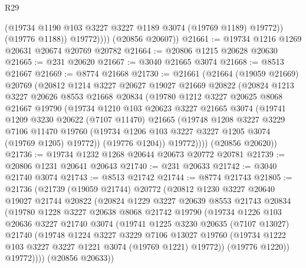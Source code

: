 \begin{lexlean}{R29}
\begin{coremodule}
                  (@19734 @1190 @103 @3227 @3227 @1189 @3074 (@19769 @1189) @19772))
                (@19776 @1188))
              @19772))))
      (@20856 @20607))
@21661 := @19734 @1216 @1269 @20631 @20674 @20769 @20782
@21664 := @20806 @1215 @20628 @20630
@21665 := @231 @20620
@21667 := @3040 @21665 @3074
@21668 := @8513 @21667
@21669 := @8774 @21668
@21730 := @21661
    (@21664
      (@19059 @21669)
      @20769
      (@20812
        @1214
        @3227
        @20627
        @19027
        @21669
        @20822
        (@20824
          @1213
          @3227
          @20626
          @8553
          @21668
          @20834
          (@19780
            @1212
            @3227
            @20625
            @8068
            @21667
            @19790
            (@19734
              @1210
              @103
              @20623
              @3227
              @21665
              @3074
              (@19741
                @1209
                @3230
                @20622
                (@7107 @11470)
                @21665
                (@19748
                  @1208
                  @3227
                  @3229
                  @7106
                  @11470
                  @19760
                  (@19734 @1206 @103 @3227 @3227 @1205 @3074 (@19769 @1205) @19772))
                (@19776 @1204))
              @19772))))
      (@20856 @20620))
@21736 := @19734 @1232 @1268 @20644 @20673 @20772 @20781
@21739 := @20806 @1231 @20641 @20643
@21740 := @231 @20633
@21742 := @3040 @21740 @3074
@21743 := @8513 @21742
@21744 := @8774 @21743
@21805 := @21736
    (@21739
      (@19059 @21744)
      @20772
      (@20812
        @1230
        @3227
        @20640
        @19027
        @21744
        @20822
        (@20824
          @1229
          @3227
          @20639
          @8553
          @21743
          @20834
          (@19780
            @1228
            @3227
            @20638
            @8068
            @21742
            @19790
            (@19734
              @1226
              @103
              @20636
              @3227
              @21740
              @3074
              (@19741
                @1225
                @3230
                @20635
                (@7107 @13027)
                @21740
                (@19748
                  @1224
                  @3227
                  @3229
                  @7106
                  @13027
                  @19760
                  (@19734 @1222 @103 @3227 @3227 @1221 @3074 (@19769 @1221) @19772))
                (@19776 @1220))
              @19772))))
      (@20856 @20633))

\end{coremodule}
\end{lexlean}
